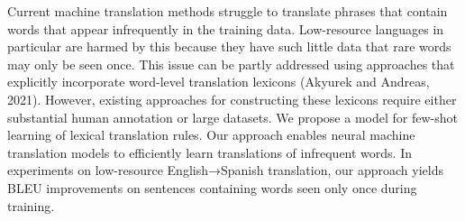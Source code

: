 Current machine translation methods struggle to translate phrases that contain words that appear infrequently in the training data. Low-resource languages in particular are harmed by this because they have such little data that rare words may only be seen once. This issue can be partly addressed using approaches that explicitly incorporate word-level translation lexicons (Akyurek and Andreas, 2021). However, existing approaches for constructing these lexicons require either substantial human annotation or large datasets. We propose a model for few-shot learning of lexical translation rules. Our approach enables neural machine translation models to efficiently learn translations of infrequent words. In experiments on low-resource English→Spanish translation, our approach yields BLEU improvements on sentences containing words seen only once during training.
